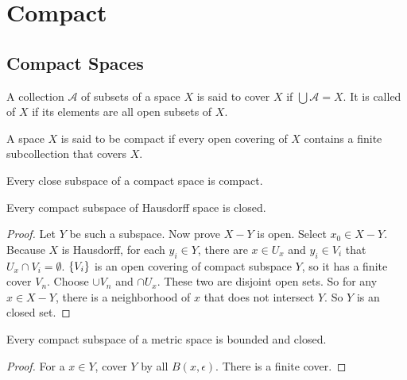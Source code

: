 \chapter{Compact}



\section{Compact Spaces}

\begin{definition}
    A collection $\mathcal{A}$ of subsets of a space $X$ is said to cover $X$ if $\bigcup \mathcal{A} = X$. It is called  of $X$ if its elements are all open subsets of $X$.
\end{definition}

\begin{definition}
    A space $X$ is said to be compact if every open covering of $X$ contains a finite subcollection that covers $X$.
\end{definition}

\begin{theorem}
    Every close subspace of a compact space is compact.    
\end{theorem}

\begin{theorem}\label{compact_subspace_closed}
    Every compact subspace of Hausdorff space is closed.    
\end{theorem}
\begin{proof}
    Let $Y$ be such a subspace. Now prove $X - Y$ is open. Select $x_0 \in X - Y$. Because $X$ is Hausdorff, for each $y_i \in Y$, there are $x \in U_x$ and $y_i \in V_i$ that $U_x \cap V_i = \emptyset$. $\set{V_i}$ is an open covering of compact subspace $Y$, so it has a finite cover $V_n$. Choose $\cup V_n$ and $\cap U_x$. These two are disjoint open sets. So for any $x \in X - Y$, there is a neighborhood of $x$ that does not intersect $Y$. So $Y$ is an closed set.
\end{proof}

\begin{theorem}
    Every compact subspace of a metric space is bounded and closed.    
\end{theorem}
\begin{proof}
    For a $x \in Y$, cover $Y$ by all $B(x, \epsilon)$. There is a finite cover.
\end{proof}


